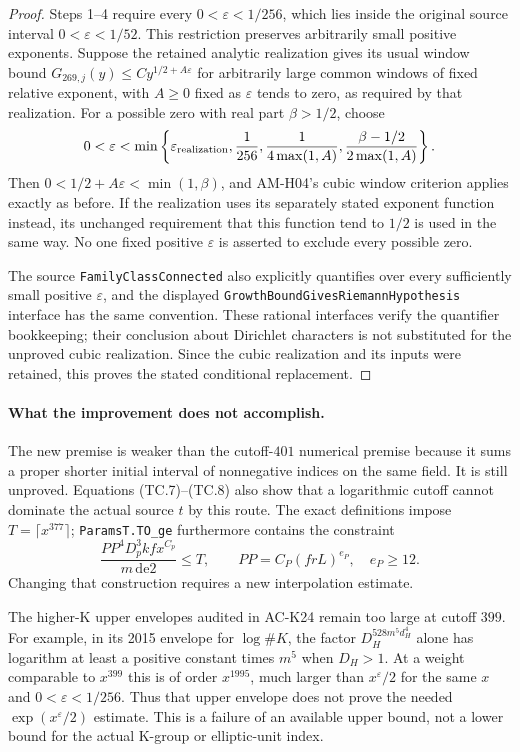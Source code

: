 \begin{proof}
Steps 1--4 require every $0<\varepsilon<1/256$, which lies
inside the original source interval $0<\varepsilon<1/52$.
This restriction preserves arbitrarily small positive exponents.
Suppose the retained analytic realization gives
its usual window bound $G_{269,j}(y)\leq C y^{1/2+A\varepsilon}$
for arbitrarily large common windows of fixed relative exponent,
with $A\geq0$ fixed as $\varepsilon$ tends to zero, as required by
that realization.  For a possible zero with real part
$\beta>1/2$, choose
\[
 0<\varepsilon<\min\left\{\varepsilon_{\rm realization},
       \frac1{256},\frac1{4\max(1,A)},
       \frac{\beta-1/2}{2\max(1,A)}\right\}.
\]
Then $0<1/2+A\varepsilon<\min(1,\beta)$, and AM-H04's cubic
window criterion applies exactly as before.  If the realization
uses its separately stated exponent function instead, its
unchanged requirement that this function tend to $1/2$
is used in the same way.  No one fixed positive $\varepsilon$
is asserted to exclude every possible zero.

The source \texttt{FamilyClassConnected} also explicitly
quantifies over every sufficiently small positive $\varepsilon$,
and the displayed \texttt{GrowthBoundGivesRiemannHypothesis}
interface has the same convention.  These rational interfaces
verify the quantifier bookkeeping; their conclusion about
Dirichlet characters is not substituted for the unproved cubic
realization.  Since the cubic realization and its inputs were
retained, this proves the stated conditional replacement.
\end{proof}

\paragraph{What the improvement does not accomplish.}
The new premise is weaker than the cutoff-$401$ numerical
premise because it sums a proper shorter initial interval of
nonnegative indices on the same field.  It is still unproved.
Equations (TC.7)--(TC.8) also show that a logarithmic cutoff
cannot dominate the actual source $t$ by this route.
The exact definitions impose $T=\lceil x^{377}\rceil$;
\texttt{ParamsT.TO\_ge} furthermore contains the constraint
\[
 \frac{PP^4 D_p^3 k f x^{C_p}}{m\,\mathrm{de2}}\leq T,
 \qquad PP=C_P(frL)^{e_P},\quad e_P\geq12.
\]
Changing that construction requires a new interpolation estimate.

The higher-K upper envelopes audited in AC-K24 remain too large
at cutoff $399$.  For example, in its 2015 envelope for
$\log\#K$, the factor $D_H^{528m^5d_H^4}$ alone has logarithm
at least a positive constant times $m^5$ when $D_H>1$.
At a weight comparable to $x^{399}$ this is of order
$x^{1995}$, much larger than $x^\varepsilon/2$ for the
same $x$ and $0<\varepsilon<1/256$.  Thus that upper envelope
does not prove the needed $\exp(x^\varepsilon/2)$ estimate.
This is a failure of an available upper bound, not a lower bound
for the actual K-group or elliptic-unit index.

